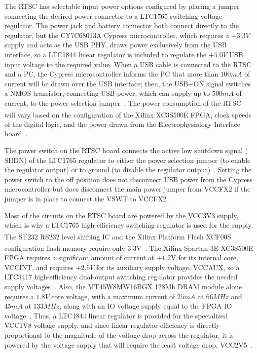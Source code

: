 The RTSC has selectable input power options configured by placing a jumper connecting the desired power connector to a LTC1765 switching voltage regulator.  The power jack and battery connector both connect directly to the regulator, but the CY7C68013A Cypress microcontroller, which requires a $+3.3\unit{V}$ supply and acts as the USB PHY, draws power exclusively from the USB interface, so a LTC1844 linear regulator is included to regulate the $+5.0\unit{V}$ USB input voltage to the required value.  When a USB cable is connected to the RTSC and a PC, the Cypress microcontroller informs the PC that more than $100\unit{mA}$ of current will be drawn over the USB interface; then, the USB$-$ON signal switches a NMOS transistor, connecting USB power, which can supply up to $500\unit{mA}$ of current, to the power selection jumper~\cite{DigilentNexys2rm,DigilentNexys2sch}.  The power consumption of the RTSC will vary based on the configuration of the Xilinx\textsuperscript{\textregistered} XC3S500E FPGA, clock speeds of the digital logic, and the power drawn from the Electrophysiology Interface board~\cite{DigilentNexys2rm}.

The power switch on the RTSC board connects the active low shutdown signal ($\overline{\mathrm{SHDN}}$) of the LTC1765 regulator to either the power selection jumper (to enable the regulator output) or to ground (to disable the regulator output)~\cite{LT1765ds}.  Setting the power switch to the off position does not disconnect USB power from the Cypress microcontroller but does disconnect the main power jumper from VCCFX2 if the jumper is in place to connect the VSWT to VCCFX2~\cite{DigilentNexys2sch}.

Most of the circuits on the RTSC board are powered by the VCC3V3 supply, which is why a LTC1765 high-efficiency switching regulator is used for the supply.  The ST232 RS232 level shifting IC and the Xilinx\textsuperscript{\textregistered} Platform Flash XCF00S configuration flash memory require only 3.3V~\cite{ST232ds,XilinxPlatformFlashDS}.  The Xilinx\textsuperscript{\textregistered} Spartan 3E XC3S500E FPGA requires a significant amount of current at $+1.2\mathrm{V}$ for its internal core, VCCINT, and requires $+2.5\unit{V}$ for its auxiliary supply voltage, VCCAUX, so a LTC3417 high-efficiency dual-output switching regulator provides the needed supply voltages~\cite{DigilentNexys2rm,Spartan3eDS}.  Also, the MT45W8MW16BGX 128Mb DRAM module alone requires a $1.8\unit{V}$ core voltage, with a maximum current of $25\unit{mA}$ at $66\unit{MHz}$ and $45\unit{mA}$ at $133\unit{MHz}$, along with an IO voltage supply equal to the FPGA IO voltage~\cite{MicronDRAMds}.  Thus, a LTC1844 linear regulator is provided for the specialized VCC1V8 voltage supply, and since linear regulator efficiency is directly proportional to the magnitude of the voltage drop across the regulator, it is powered by the voltage supply that will require the least voltage drop, VCC2V5~\cite{DigilentNexys2sch}.

